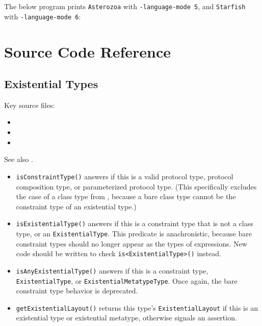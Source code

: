 \documentclass[../generics]{subfiles}
\begin{document}
\begin{example}
The below program prints \texttt{Asterozoa} with \verb|-language-mode 5|, and \texttt{Starfish} with \verb|-language-mode 6|:
\end{example}

\section{Source Code Reference}\label{src:existential types}

\subsection*{Existential Types}

Key source files:
\begin{itemize}
\item {}
\item {}
\item {}
\end{itemize}

See also .
\begin{itemize}
\item \texttt{isConstraintType()} answers if this is a valid protocol type, protocol composition type, or parameterized protocol type. (This specifically excludes the case of a class type from , because a bare class type cannot be the constraint type of an existential type.)
\item \texttt{isExistentialType()} answers if this is a constraint type that is not a class type, or an \texttt{ExistentialType}. This predicate is anachronistic, because bare constraint types should no longer appear as the types of expressions. New code should be written to check \texttt{is<ExistentialType>()} instead.
\item \texttt{isAnyExistentialType()} answers if this is a constraint type, \texttt{ExistentialType}, or \texttt{ExistentialMetatypeType}. Once again, the bare constraint type behavior is deprecated.
\item \texttt{getExistentialLayout()} returns this type's \texttt{ExistentialLayout} if this is an existential type or existential metatype, otherwise signals an assertion.
\end{itemize}
\end{document}
